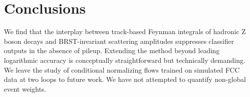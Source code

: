 \section{Conclusions}\label{sec:conclusions}

We find that the interplay between track-based Feynman integrals of
hadronic Z boson decays and BRST-invariant scattering amplitudes
suppresses classifier outputs in the absence of pileup. Extending the
method beyond leading logarithmic accuracy is conceptually
straightforward but technically demanding. We leave the study of
conditional normalizing flows trained on simulated FCC data at two loops
to future work. We have not attempted to quantify non-global event
weights.

